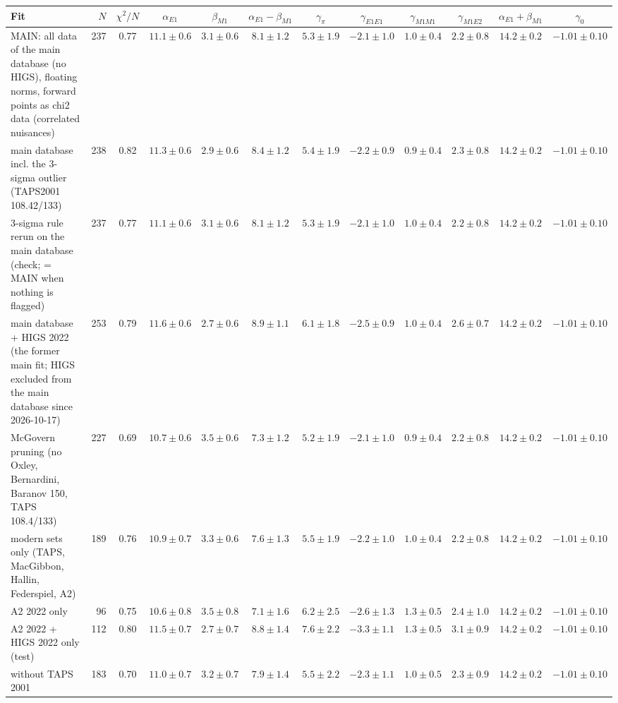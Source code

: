 \begin{tabular}{l r c cccc ccc cc}
\hline
Fit & $N$ & $\chi^2/N$ & $\alpha_{E1}$ & $\beta_{M1}$ & $\alpha_{E1}-\beta_{M1}$ & $\gamma_\pi$ & $\gamma_{E1E1}$ & $\gamma_{M1M1}$ & $\gamma_{M1E2}$ & $\alpha_{E1}+\beta_{M1}$ & $\gamma_0$\\\hline
MAIN: all data of the main database (no HIGS), floating norms, forward points as chi2 data (correlated nuisances) & 237 & 0.77 & $11.1\pm0.6$ & $3.1\pm0.6$ & $8.1\pm1.2$ & $5.3\pm1.9$ & $-2.1\pm1.0$ & $1.0\pm0.4$ & $2.2\pm0.8$ & $14.2\pm0.2$ & $-1.01\pm0.10$\\
main database incl. the 3-sigma outlier (TAPS2001 108.42/133) & 238 & 0.82 & $11.3\pm0.6$ & $2.9\pm0.6$ & $8.4\pm1.2$ & $5.4\pm1.9$ & $-2.2\pm0.9$ & $0.9\pm0.4$ & $2.3\pm0.8$ & $14.2\pm0.2$ & $-1.01\pm0.10$\\
3-sigma rule rerun on the main database (check; = MAIN when nothing is flagged) & 237 & 0.77 & $11.1\pm0.6$ & $3.1\pm0.6$ & $8.1\pm1.2$ & $5.3\pm1.9$ & $-2.1\pm1.0$ & $1.0\pm0.4$ & $2.2\pm0.8$ & $14.2\pm0.2$ & $-1.01\pm0.10$\\
main database + HIGS 2022 (the former main fit; HIGS excluded from the main database since 2026-10-17) & 253 & 0.79 & $11.6\pm0.6$ & $2.7\pm0.6$ & $8.9\pm1.1$ & $6.1\pm1.8$ & $-2.5\pm0.9$ & $1.0\pm0.4$ & $2.6\pm0.7$ & $14.2\pm0.2$ & $-1.01\pm0.10$\\
McGovern pruning (no Oxley, Bernardini, Baranov 150, TAPS 108.4/133) & 227 & 0.69 & $10.7\pm0.6$ & $3.5\pm0.6$ & $7.3\pm1.2$ & $5.2\pm1.9$ & $-2.1\pm1.0$ & $0.9\pm0.4$ & $2.2\pm0.8$ & $14.2\pm0.2$ & $-1.01\pm0.10$\\
modern sets only (TAPS, MacGibbon, Hallin, Federspiel, A2) & 189 & 0.76 & $10.9\pm0.7$ & $3.3\pm0.6$ & $7.6\pm1.3$ & $5.5\pm1.9$ & $-2.2\pm1.0$ & $1.0\pm0.4$ & $2.2\pm0.8$ & $14.2\pm0.2$ & $-1.01\pm0.10$\\
A2 2022 only & 96 & 0.75 & $10.6\pm0.8$ & $3.5\pm0.8$ & $7.1\pm1.6$ & $6.2\pm2.5$ & $-2.6\pm1.3$ & $1.3\pm0.5$ & $2.4\pm1.0$ & $14.2\pm0.2$ & $-1.01\pm0.10$\\
A2 2022 + HIGS 2022 only (test) & 112 & 0.80 & $11.5\pm0.7$ & $2.7\pm0.7$ & $8.8\pm1.4$ & $7.6\pm2.2$ & $-3.3\pm1.1$ & $1.3\pm0.5$ & $3.1\pm0.9$ & $14.2\pm0.2$ & $-1.01\pm0.10$\\
without TAPS 2001 & 183 & 0.70 & $11.0\pm0.7$ & $3.2\pm0.7$ & $7.9\pm1.4$ & $5.5\pm2.2$ & $-2.3\pm1.1$ & $1.0\pm0.5$ & $2.3\pm0.9$ & $14.2\pm0.2$ & $-1.01\pm0.10$\\

\end{tabular}

